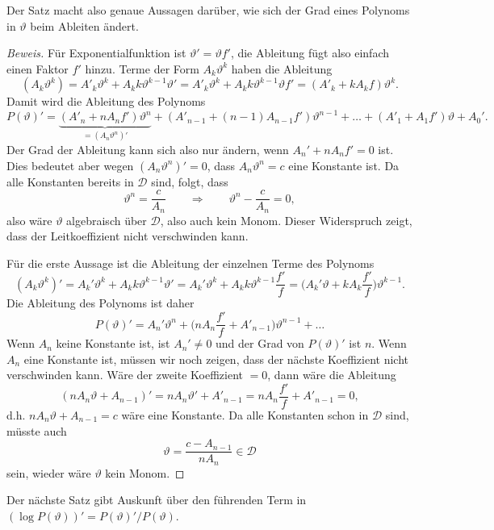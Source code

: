 Der Satz macht also genaue Aussagen darüber, wie sich der Grad eines
Polynoms in $\vartheta$ beim Ableiten ändert.

\begin{proof}[Beweis]
Für Exponentialfunktion ist $\vartheta'=\vartheta f'$, die Ableitung
fügt also einfach einen Faktor $f'$ hinzu.
Terme der Form $A_k\vartheta^k$ haben die Ableitung
\[
(A_k\vartheta^k)
=
A'_k\vartheta^k + A_kk\vartheta^{k-1}\vartheta'
=
A'_k\vartheta^k + A_kk\vartheta^{k-1}\vartheta f'
=
(A'_k + kA_k f)\vartheta^k.
\]
Damit wird die Ableitung des Polynoms
\begin{equation}
P(\vartheta)'
=
\underbrace{(A'_n+nA_nf')\vartheta^n}_{\displaystyle=(A_n\vartheta^n)'}
+
(A'_{n-1}+(n-1)A_{n-1}f')\vartheta^{n-1}
+ \dots + 
(A'_1+A_1f')\vartheta + A_0'.
\label{buch:integrale:ableitung:polynom}
\end{equation}
Der Grad der Ableitung kann sich also nur ändern, wenn $A_n'+nA_nf'=0$ ist.
Dies bedeutet aber wegen
\(
(A_n\vartheta^n)'
=
0
\), dass  $A_n\vartheta^n=c$ eine Konstante ist.
Da alle Konstanten bereits in $\mathscr{D}$ sind, folgt, dass
\[
\vartheta^n=\frac{c}{A_n}
\qquad\Rightarrow\qquad
\vartheta^n - \frac{c}{A_n}=0,
\]
also wäre $\vartheta$ algebraisch über $\mathscr{D}$, also auch kein Monom.
Dieser Widerspruch zeigt, dass der Leitkoeffizient nicht verschwinden kann.

Für die erste Aussage ist die Ableitung der einzelnen Terme des Polynoms
\[
(A_k\vartheta^k)'
=
A_k'\vartheta^k + A_kk\vartheta^{k-1}\vartheta'
=
A_k'\vartheta^k + A_kk\vartheta^{k-1}\frac{f'}{f}
=
\biggl(A_k'\vartheta + kA_k\frac{f'}{f}\biggr)\vartheta^{k-1}.
\]
Die Ableitung des Polynoms ist daher
\[
P(\vartheta)'
=
A_n'\vartheta^n + \biggl(nA_n\frac{f'}{f}+ A'_{n-1}\biggr)\vartheta^{n-1}+\dots
\]
Wenn $A_n$ keine Konstante ist, ist $A_n'\ne 0$ und der Grad von
$P(\vartheta)'$ ist $n$.
Wenn $A_n$ eine Konstante ist, müssen wir noch zeigen, dass der nächste
Koeffizient nicht verschwinden kann.
Wäre der zweite Koeffizient $=0$, dann wäre die Ableitung
\[
(nA_n\vartheta+A_{n-1})'
=
nA_n\vartheta'+A'_{n-1}
=
nA_n\frac{f'}{f}+A'_{n-1}
=
0,
\]
d.h. $nA_n\vartheta+A_{n-1}=c$ wäre eine Konstante.
Da alle Konstanten schon in $\mathscr{D}$ sind, müsste auch
\[
\vartheta = \frac{c-A_{n-1}}{nA_n} \in \mathscr{D}
\]
sein, wieder wäre $\vartheta$ kein Monom.
\end{proof}

Der nächste Satz gibt Auskunft über den führenden Term in
$(\log P(\vartheta))' = P(\vartheta)'/P(\vartheta)$.

